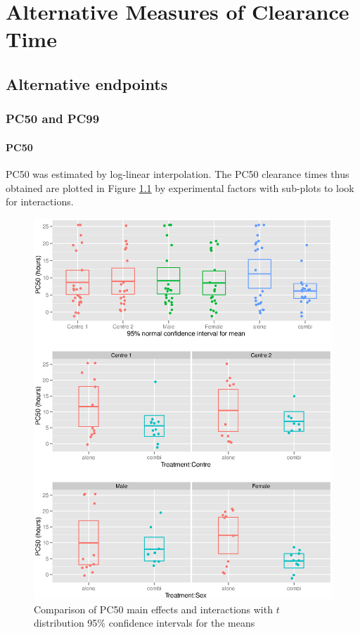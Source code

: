 \chapter{Alternative Measures of Clearance Time}\label{ch:alternative}

\section{Alternative endpoints}
\subsection{PC50 and PC99}
\subsubsection*{PC50}
PC50 was estimated by log-linear interpolation. The PC50 clearance times thus obtained are plotted in Figure \ref{pc50anova} by experimental factors with sub-plots to look for interactions.
\begin{figure}[p]
\includegraphics[width=150mm]{pc50anova.eps} 
\caption{Comparison of PC50 main effects and interactions with $t$ distribution 95\% confidence intervals for the means}
\label{pc50anova}
\end{figure}
